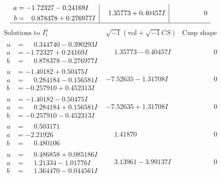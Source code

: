 \documentclass[1p]{elsarticle_modified}
\theoremstyle{definition}
\newcommand{\I}{\sqrt{-1}}
\begin{document}
$$\begin{array}{c|c|c}
\begin{aligned}
a &= -1.72327 - 0.24169 I \\
b &= \phantom{-}0.878378 + 0.276977 I\end{aligned}
 & \phantom{-}1.35773 + 0.40457 I & \phantom{-0.000000 } 0\\
 \hline 
 \end{array}$$\newpage$$\begin{array}{c|c|c}  
\text{Solutions to }I^u_{1}& \I (\text{vol} + \sqrt{-1}CS) & \text{Cusp shape}\\
 \hline 
\begin{aligned}
u &= \phantom{-}0.344740 - 0.390293 I \\
a &= -1.72327 + 0.24169 I \\
b &= \phantom{-}0.878378 - 0.276977 I\end{aligned}
 & \phantom{-}1.35773 - 0.40457 I & \phantom{-0.000000 } 0 \\ \hline\begin{aligned}
u &= -1.40182 + 0.50475 I \\
a &= \phantom{-}0.284184 - 0.156581 I \\
b &= -0.257910 + 0.452313 I\end{aligned}
 & -7.52635 - 1.31708 I & \phantom{-0.000000 } 0 \\ \hline\begin{aligned}
u &= -1.40182 - 0.50475 I \\
a &= \phantom{-}0.284184 + 0.156581 I \\
b &= -0.257910 - 0.452313 I\end{aligned}
 & -7.52635 + 1.31708 I & \phantom{-0.000000 } 0 \\ \hline\begin{aligned}
u &= \phantom{-}0.503171\phantom{ +0.000000I} \\
a &= -2.21926\phantom{ +0.000000I} \\
b &= \phantom{-}0.480106\phantom{ +0.000000I}\end{aligned}
 & \phantom{-}1.41870\phantom{ +0.000000I} & \phantom{-0.000000 } 0 \\ \hline\begin{aligned}
u &= \phantom{-}0.486858 + 0.085186 I \\
a &= \phantom{-}1.21334 - 1.01776 I \\
b &= \phantom{-}1.364470 - 0.044561 I\end{aligned}
 & \phantom{-}3.13961 - 3.99137 I & \phantom{-0.000000 } 0 \\ \hline\begin{aligned}

\end{aligned}
\end{array}$$
\end{document}
